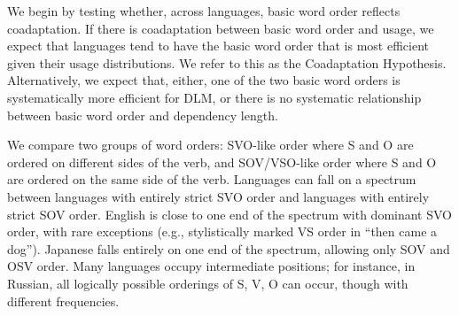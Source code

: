 \documentclass[11pt,a4paper]{article}
\newcommand\mhahn[1]{{\color{red}(#1)}}
\begin{document}
















We begin by testing whether, across languages, basic word order reflects coadaptation.
If there is coadaptation between basic word order and usage, we expect that languages tend to have the basic word order that is most efficient given their usage distributions.
We refer to this as the Coadaptation Hypothesis.
Alternatively, we expect that, either, one of the two basic word orders is systematically more efficient for DLM, or there is no systematic relationship between basic word order and dependency length.




We compare two groups of word orders: SVO-like order where S and O are ordered on different sides of the verb, and SOV/VSO-like order where S and O are ordered on the same side of the verb.
Languages can fall on a spectrum between languages with entirely strict SVO order and languages with entirely strict SOV order.
English is close to one end of the spectrum with dominant SVO order, with rare exceptions (e.g., stylistically marked VS order in ``then came a dog'').
Japanese falls entirely on one end of the spectrum, allowing only SOV and OSV order.
Many languages occupy intermediate positions; for instance, in Russian, all logically possible orderings of S, V, O can occur, though with different frequencies.
\end{document}
